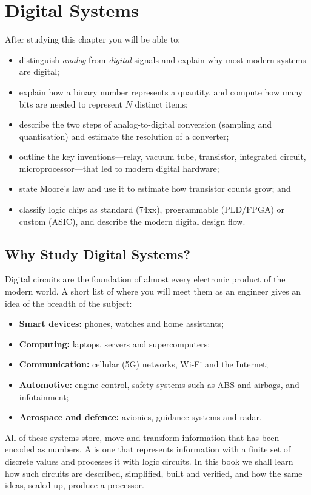 \chapter{Digital Systems}\label{ch:digital}

\begin{objectives}
After studying this chapter you will be able to:
\begin{itemize}
  \item distinguish \emph{analog} from \emph{digital} signals and explain why most modern systems are digital;
  \item explain how a binary number represents a quantity, and compute how many bits are needed to represent $N$ distinct items;
  \item describe the two steps of analog-to-digital conversion (sampling and quantisation) and estimate the resolution of a converter;
  \item outline the key inventions---relay, vacuum tube, transistor, integrated circuit, microprocessor---that led to modern digital hardware;
  \item state Moore's law and use it to estimate how transistor counts grow; and
  \item classify logic chips as standard (74xx), programmable (PLD/FPGA) or custom (ASIC), and describe the modern digital design flow.
\end{itemize}
\end{objectives}

\section{Why Study Digital Systems?}
Digital circuits are the foundation of almost every electronic product of the modern world. A short list of where you will meet them as an engineer gives an idea of the breadth of the subject:
\begin{itemize}
  \item \textbf{Smart devices:} phones, watches and home assistants;
  \item \textbf{Computing:} laptops, servers and supercomputers;
  \item \textbf{Communication:} cellular (5G) networks, Wi-Fi and the Internet;
  \item \textbf{Automotive:} engine control, safety systems such as ABS and airbags, and infotainment;
  \item \textbf{Aerospace and defence:} avionics, guidance systems and radar.
\end{itemize}
All of these systems store, move and transform information that has been encoded as numbers. A  is one that
represents information with a finite set of discrete values and processes it with logic circuits. In this book we shall learn how such
circuits are described, simplified, built and verified, and how the same ideas, scaled up, produce a processor.

